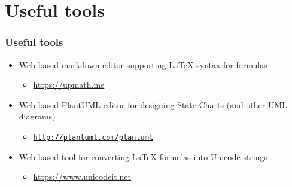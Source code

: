 \documentclass[presentation]{beamer}\mode<presentation>{\usetheme{AMSCesenaPurpleAndGold}}
\begin{document}
\section{Useful tools}

\begin{frame}\label{useful-tools}
\frametitle{Useful tools}
    
    \begin{itemize}
        \item Web-based markdown editor supporting \LaTeX{} syntax for formulas
        \begin{itemize}
            \item \url{https://upmath.me}
        \end{itemize}
        
        \vfill
        
        \item Web-based \href{http://plantuml.com/}{PlantUML} editor for designing State Charts (and other UML diagrams)
        \begin{itemize}
            \item \href{http://www.plantuml.com/plantuml/uml/XOz1JW8n58RtFSLRWWbaW1qXG4HCt60Yi48MpVI93Prsqhwget4XmSG5rt2XPp7n3dCI2uYEoIGkclxfz_wlUNr7t99F57DBgLDkUG8dUCMzebEZQIpl4PfH0Ow94-uGPGf14bSoTkNj4KyG1iPRYPPTIu60IKeP27InbIb9ercXwRPgU600npnUBgpnMWoCChRJ6MeXzQBR1QFa3PPDJ3NUfI6X25CPAcLksIDZiwCvr6fTS17RwKDeW_5KeNprLAr_frMrBdM5FjQ_TmJvosiupyn5UqEZKBpKi_Ff9AGvEtW3_jUsUTksyyqxSuszjDc6ptMmdOt6mul9_EUzLR2LVDQ4lnkteTVh7M2h5FPH2v-eBm00}{\texttt{http://plantuml.com/plantuml}}
        \end{itemize}
        
        \vfill
        
        \item Web-based tool for converting \LaTeX{} formulas into Unicode strings
        \begin{itemize}
            \item \url{https://www.unicodeit.net}
        \end{itemize}
    \end{itemize}
    
\end{frame}

\maketitle

\end{document}
